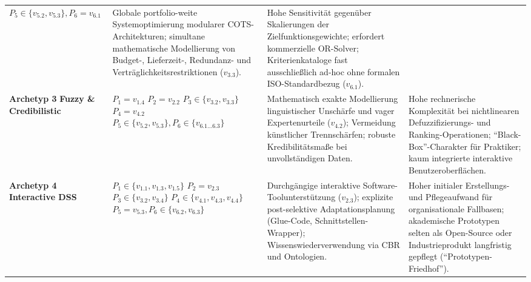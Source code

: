 \begin{landscape}
\begin{xltabular}{\linewidth}{>{\raggedright\arraybackslash}p{3.2cm}>{\raggedright\arraybackslash}p{4.2cm}>{\raggedright\arraybackslash}X>{\raggedright\arraybackslash}X}
      $P_5 \in \{v_{5.2}, v_{5.3}\}, P_6 = v_{6.1}$
    & Globale portfolio-weite Systemoptimierung modularer COTS-Architekturen; simultane mathematische Modellierung von Budget-, Lieferzeit-, Redundanz- und Verträglichkeitsrestriktionen ($v_{3.3}$).
    & Hohe Sensitivität gegenüber Skalierungen der Zielfunktionsgewichte; erfordert kommerzielle OR-Solver; Kriterienkataloge fast ausschließlich ad-hoc ohne formalen ISO-Standardbezug ($v_{6.1}$). \\
  \addlinespace[6pt]
  \textbf{Archetyp 3} \newline \textbf{Fuzzy \& Credibilistic} 
    & $P_1 = v_{1.4}$ \newline
      $P_2 = v_{2.2}$ \newline
      $P_3 \in \{v_{3.2}, v_{3.3}\}$ \newline
      $P_4 = v_{4.2}$ \newline
      $P_5 \in \{v_{5.2}, v_{5.3}\}, P_6 \in \{v_{6.1 \dots 6.3}\}$
    & Mathematisch exakte Modellierung linguistischer Unschärfe und vager Expertenurteile ($v_{4.2}$); Vermeidung künstlicher Trennschärfen; robuste Kredibilitätsmaße bei unvollständigen Daten.
    & Hohe rechnerische Komplexität bei nichtlinearen Defuzzifizierungs- und Ranking-Operationen; \enquote{Black-Box}-Charakter für Praktiker; kaum integrierte interaktive Benutzeroberflächen. \\
  \addlinespace[6pt]
  \textbf{Archetyp 4} \newline \textbf{Interactive DSS} 
    & $P_1 \in \{v_{1.1}, v_{1.3}, v_{1.5}\}$ \newline
      $P_2 = v_{2.3}$ \newline
      $P_3 \in \{v_{3.2}, v_{3.4}\}$ \newline
      $P_4 \in \{v_{4.1}, v_{4.3}, v_{4.4}\}$ \newline
      $P_5 = v_{5.3}, P_6 \in \{v_{6.2}, v_{6.3}\}$
    & Durchgängige interaktive Software-Toolunterstützung ($v_{2.3}$); explizite post-selektive Adaptationsplanung (Glue-Code, Schnittstellen-Wrapper); Wissenswiederverwendung via CBR und Ontologien.
    & Hoher initialer Erstellungs- und Pflegeaufwand für organisationale Fallbasen; akademische Prototypen selten als Open-Source oder Industrieprodukt langfristig gepflegt (\enquote{Prototypen-Friedhof}). \\
\end{xltabular}

\newpage

\end{landscape}
